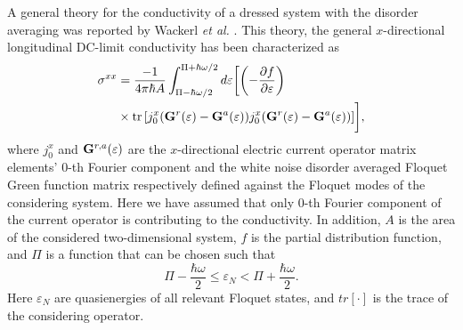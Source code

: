 
A general theory for the conductivity of a dressed system with the disorder averaging was reported by Wackerl \textit{et al.} \cite{wackerl20,wackerlthesis20}. This theory, the general $x$-directional longitudinal DC-limit conductivity has been characterized as
\begin{equation} \label{eq_20}
  \begin{aligned}
    {\sigma}^{xx} &=
    \frac{-1}{4\pi\hbar A}
    \int_{\Pi-\hbar\omega/2}^{\Pi+ \hbar\omega/2} d\varepsilon \bigg[
    \qty(
    -\frac{\partial f}{\partial \varepsilon})
    \\
    & \times
    \tr
    \qty[
    {j}^x_0
    \qty(
    \vb{G}^{r} (\varepsilon) - \vb{G}^{a} (\varepsilon)
    )
    {j}^x_0
    \qty(
    \vb{G}^{r} (\varepsilon) - \vb{G}^{a} (\varepsilon)
    )
    ]\bigg],
  \end{aligned}
\end{equation}
where ${j}^x_0$ and $\vb{G}^{r,a} (\varepsilon)$ are the $x$-directional electric current operator matrix elements' $0$-th Fourier component and the white noise disorder averaged Floquet Green function matrix \cite{wackerl20,wackerlthesis20} respectively defined against the Floquet modes of the considering system. Here we have assumed that only $0$-th Fourier component of the current operator is contributing to the conductivity. In addition, $A$ is the area of the considered two-dimensional system, $f$ is the partial distribution function, and $\Pi$ is a function that can be chosen such that
\begin{equation} \label{eq_21}
    \Pi- \frac{\hbar \omega}{2}
    \leq \varepsilon_N
    <
    \Pi + \frac{\hbar \omega}{2}.
\end{equation}
Here $ \varepsilon_N$ are quasienergies of all relevant Floquet states, and $tr[\cdot]$ is the trace of the considering operator.

